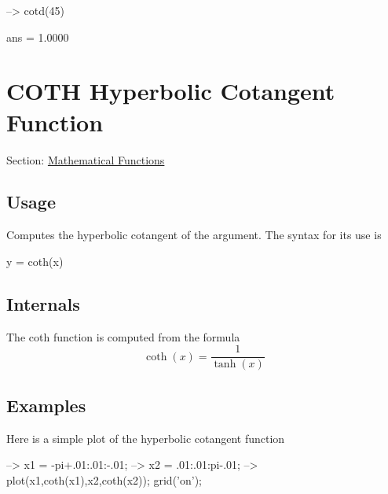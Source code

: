 \begin{DoxyVerbInclude}
--> cotd(45)

ans = 
    1.0000 
\end{DoxyVerbInclude}
 \hypertarget{mathfunctions_coth}{}\section{C\-O\-T\-H Hyperbolic Cotangent Function}\label{mathfunctions_coth}
Section\-: \hyperlink{sec_mathfunctions}{Mathematical Functions} \hypertarget{vtkwidgets_vtkxyplotwidget_Usage}{}\subsection{Usage}\label{vtkwidgets_vtkxyplotwidget_Usage}
Computes the hyperbolic cotangent of the argument. The syntax for its use is \begin{DoxyVerb}   y = coth(x)
\end{DoxyVerb}
 \hypertarget{transforms_svd_Function}{}\subsection{Internals}\label{transforms_svd_Function}
The {\ttfamily coth} function is computed from the formula \[ \coth(x) = \frac{1}{\tanh(x)} \] \hypertarget{variables_matrix_Examples}{}\subsection{Examples}\label{variables_matrix_Examples}
Here is a simple plot of the hyperbolic cotangent function


\begin{DoxyVerbInclude}
--> x1 = -pi+.01:.01:-.01;
--> x2 = .01:.01:pi-.01;
--> plot(x1,coth(x1),x2,coth(x2)); grid('on');
\end{DoxyVerbInclude}


